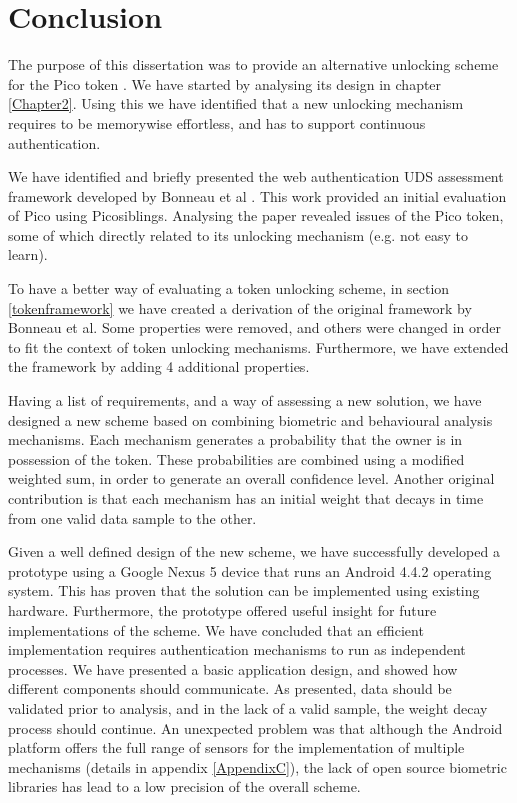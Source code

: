 
\chapter{Conclusion} %

\label{Chapter7} %


The purpose of this dissertation was to provide an alternative unlocking scheme for the Pico token \cite{stajano2011pico}. We have started by analysing its design in chapter \ref{Chapter2}. Using this we have identified that a new unlocking mechanism requires to be memorywise effortless, and has to support continuous authentication.

We have identified and briefly presented the web authentication UDS assessment framework developed by Bonneau et al \cite{bonneau2012quest}. This work provided an initial evaluation of Pico using Picosiblings. Analysing the paper revealed issues of the Pico token, some of which directly related to its unlocking mechanism (e.g. not easy to learn).

To have a better way of evaluating a token unlocking scheme, in section \ref{tokenframework} we have created a derivation of the original framework by Bonneau et al. Some properties were removed, and others were changed in order to fit the context of token unlocking mechanisms. Furthermore, we have extended the framework by adding 4 additional properties.

Having a list of requirements, and a way of assessing a new solution, we have designed a new scheme based on combining biometric and behavioural analysis mechanisms. Each mechanism generates a probability that the owner is in possession of the token. These probabilities are combined using a modified weighted sum, in order to generate an overall confidence level. Another original contribution is that each mechanism has an initial weight that decays in time from one valid data sample to the other. 

Given a well defined design of the new scheme, we have successfully developed a prototype using a Google Nexus 5 device that runs an Android 4.4.2 operating system. This has proven that the solution can be implemented using existing hardware. Furthermore, the prototype offered useful insight for future implementations of the scheme. We have concluded that an efficient implementation requires authentication mechanisms to run as independent processes. We have presented a basic application design, and showed how different components should communicate. As presented, data should be validated prior to analysis, and in the lack of a valid sample, the weight decay process should continue. An unexpected problem was that although the Android platform offers the full range of sensors for the implementation of multiple mechanisms (details in appendix \ref{AppendixC}), the lack of open source biometric libraries has lead to a low precision of the overall scheme.

